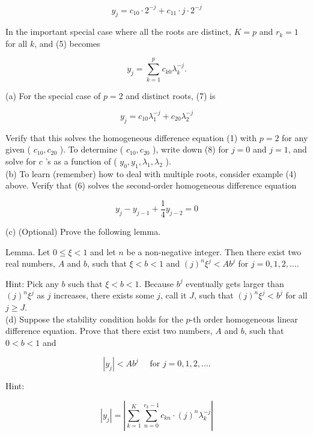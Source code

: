\documentclass[10pt]{article}
\begin{document}
\begin{equation*}
y_{j}=c_{10} \cdot 2^{-j}+c_{11} \cdot j \cdot 2^{-j} \tag{6}
\end{equation*}


In the important special case where all the roots are distinct, $K=p$ and $r_{k}=1$\\
for all $k$, and (5) becomes


\begin{equation*}
y_{j}=\sum_{k=1}^{p} c_{k 0} \lambda_{k}^{-j} . \tag{7}
\end{equation*}


(a) For the special case of $p=2$ and distinct roots, (7) is


\begin{equation*}
y_{j}=c_{10} \lambda_{1}^{-j}+c_{20} \lambda_{2}^{-j} \tag{8}
\end{equation*}


Verify that this solves the homogeneous difference equation (1) with $p=2$ for any given ( $c_{10}, c_{20}$ ). To determine ( $c_{10}, c_{20}$ ), write down (8) for $j=0$ and $j=1$, and solve for $c$ 's as a function of ( $y_{0}, y_{1}, \lambda_{1}, \lambda_{2}$ ).\\
(b) To learn (remember) how to deal with multiple roots, consider example (4) above. Verify that (6) solves the second-order homogeneous difference equation

$$
y_{j}-y_{j-1}+\frac{1}{4} y_{j-2}=0
$$

(c) (Optional) Prove the following lemma.

Lemma. Let $0 \leq \xi<1$ and let $n$ be a non-negative integer. Then there exist two real numbers, $A$ and $b$, such that $\xi<b<1$ and $(j)^{n} \xi^{j}<A b^{j}$ for $j=0,1,2, \ldots$.

Hint: Pick any $b$ such that $\xi<b<1$. Because $b^{j}$ eventually gets larger than $(j)^{n} \xi^{j}$ as $j$ increases, there exists some $j$, call it $J$, such that $(j)^{n} \xi^{j}<b^{j}$ for all $j \geq J$.\\
(d) Suppose the stability condition holds for the $p$-th order homogeneous linear difference equation. Prove that there exist two numbers, $A$ and $b$, such that $0<b<1$ and

$$
\left|y_{j}\right|<A b^{j} \quad \text { for } j=0,1,2, \ldots .
$$

Hint:

$$
\left|y_{j}\right|=\left|\sum_{k=1}^{K} \sum_{n=0}^{r_{k}-1} c_{k n} \cdot(j)^{n} \lambda_{k}^{-j}\right|
$$
\end{document}

